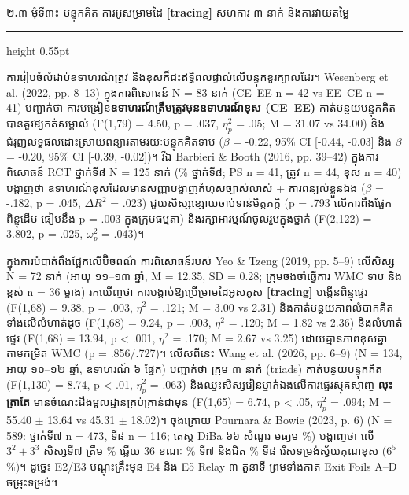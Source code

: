\documentclass[a4paper,12pt]{article}
\newcommand{\en}[1]{{\TimesEn #1}}
\newcommand{\enbf}[1]{{\TimesEn\textbf{#1}}}
\newcommand{\subsectitle}[1]{{\muol\fontsize{11.5pt}{18.5pt}\selectfont #1}}
\newcommand{\subsec}[1]{%
  \Needspace{1.7cm}%
  \vspace{3pt}%
  \subsectitle{#1}\par%
  \vspace{-2pt}%
  {\color{black}\hrule height 0.55pt}%
  \vspace{3pt}%
}
\begin{document}
\subsec{២\enbf{.}៣ មុំទី៣៖ បន្ទុកគិត ការអូសម្រាមដៃ \enbf{[tracing]} សហការ ៣ នាក់ និងការវាយតម្លៃ}

ការរៀបចំលំដាប់ឧទាហរណ៍ត្រូវ និងខុសក៏ជះឥទ្ធិពលផ្ទាល់លើបន្ទុកខួរក្បាលដែរ។ \en{Wesenberg et al. (2022, pp. 8--13)} ក្នុងការពិសោធន៍ \en{N = 83} នាក់ (\en{CE--EE n = 42} \en{vs} \en{EE--CE n = 41}) បញ្ជាក់ថា ការបង្រៀន\textbf{ឧទាហរណ៍ត្រឹមត្រូវមុនឧទាហរណ៍ខុស (\en{CE--EE})} កាត់បន្ថយបន្ទុកគិតបានគួរឱ្យកត់សម្គាល់ (\en{F(1,79) = 4.50, p = .037, $\eta_p^2$ = .05; M = 31.07 vs 34.00}) និងជំរុញលទ្ធផលដោះស្រាយពន្យារតាមរយៈបន្ទុកគិតទាប (\en{$\beta$ = -0.22, 95\% CI [-0.44, -0.03]} និង \en{$\beta$ = -0.20, 95\% CI [-0.39, -0.02]})។ រីឯ \en{Barbieri \& Booth (2016, pp. 39--42)} ក្នុងការពិសោធន៍ \en{RCT} ថ្នាក់ទី៨ \en{N = 125} នាក់ (\en{97\%} ថ្នាក់ទី៨; \en{PS n = 41}, ត្រូវ \en{n = 44}, ខុស \en{n = 40}) បង្ហាញថា ឧទាហរណ៍ខុសដែលមានសញ្ញាបង្ហាញកំហុសច្បាស់លាស់ + ការពន្យល់ខ្លួនឯង (\en{$\beta$ = -.182, p = .045, $\Delta R^2$ = .023}) ជួយសិស្សខ្សោយចាប់ទាន់មិត្តភក្ដិ (\en{p = .793} លើការពឹងផ្អែកពិន្ទុដើម ធៀបនឹង \en{p = .003} ក្នុងក្រុមធម្មតា) និងរក្សាអារម្មណ៍ចូលរួមក្នុងថ្នាក់ (\en{F(2,122) = 3.802, p = .025, $\omega_p^2$ = .043})។

ក្នុងការបំបាត់ពឹងផ្អែកលើប៊ិចពណ៌ ការពិសោធន៍របស់ \en{Yeo \& Tzeng (2019, pp. 5--9)} លើសិស្ស \en{N = 72} នាក់ (អាយុ ១១--១៣ ឆ្នាំ, \en{M = 12.35, SD = 0.28}; ក្រុមចងចាំធ្វើការ \en{WMC} ទាប និងខ្ពស់ \en{n = 36} ម្ខាង) រកឃើញថា ការបង្គាប់ឱ្យប្រើម្រាមដៃអូសគូស \en{\textbf{[tracing]}} បង្កើនពិន្ទុផ្ទេរ (\en{F(1,68) = 9.38, p = .003, $\eta^2$ = .121; M = 3.00 vs 2.31}) និងកាត់បន្ថយភាពលំបាកគិតទាំងលើលំហាត់ដូច (\en{F(1,68) = 9.24, p = .003, $\eta^2$ = .120; M = 1.82 vs 2.36}) និងលំហាត់ផ្ទេរ (\en{F(1,68) = 13.94, p < .001, $\eta^2$ = .170; M = 2.67 vs 3.25}) ដោយគ្មានភាពខុសគ្នាតាមកម្រិត \en{WMC} (\en{p = .856/.727})។ លើសពីនេះ \en{Wang et al. (2026, pp. 6--9)} (\en{N = 134}, អាយុ ១០--១២ ឆ្នាំ, ឧទាហរណ៍ ៦ ផ្នែក) បញ្ជាក់ថា ក្រុម ៣ នាក់ (\en{triads}) កាត់បន្ថយបន្ទុកគិត (\en{F(1,130) = 8.74, p < .01, $\eta_p^2$ = .063}) និងឈ្នះសិស្សរៀនម្នាក់ឯងលើការផ្ទេរស្មុគស្មាញ \textbf{លុះត្រាតែ} មានចំណេះដឹងមូលដ្ឋានគ្រប់គ្រាន់ជាមុន (\en{F(1,65) = 6.74, p < .05, $\eta_p^2$ = .094; M = 55.40 $\pm$ 13.64 vs 45.31 $\pm$ 18.02})។ ចុងក្រោយ \en{Pournara \& Bowie (2023, p. 6)} (\en{N = 589}: ថ្នាក់ទី៧ \en{n = 473}, ទី៨ \en{n = 116}; តេស្ដ \en{DiBa} ៦៦ សំណួរ មធ្យម \en{35.8\%}) បង្ហាញថា លើ $3^2+3^3$ សិស្សទី៧ ត្រឹម \en{28.2\%} ឆ្លើយ $36$ ខណៈ \en{54.5\%} ទី៧ និងជិត \en{60\%} ទី៨ រើសទម្រង់ស្វ័យគុណខុស ($6^5$ \en{36.2\%})។ ដូច្នេះ \en{E2/E3} បណ្ដុះគ្រឹះមុន \en{E4} \en{[tracing]} និង \en{E5} \en{Relay} ៣ តួនាទី ព្រមទាំងកាត \en{Exit Foils A--D} ចម្រុះទម្រង់។
\end{document}
